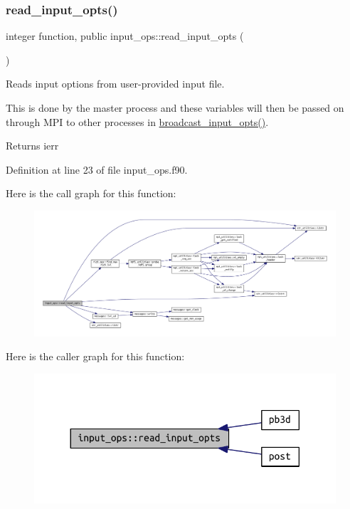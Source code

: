 \subsubsection{\texorpdfstring{read\+\_\+input\+\_\+opts()}{read\_input\_opts()}}
{\footnotesize\ttfamily integer function, public input\+\_\+ops\+::read\+\_\+input\+\_\+opts (\begin{DoxyParamCaption}{ }\end{DoxyParamCaption})}



Reads input options from user-\/provided input file. 

This is done by the master process and these variables will then be passed on through M\+PI to other processes in \hyperlink{namespacempi__ops_a932eba1c998dd7a0f1191b55cd754be3}{broadcast\+\_\+input\+\_\+opts()}.

\begin{DoxyReturn}{Returns}
ierr 
\end{DoxyReturn}


Definition at line 23 of file input\+\_\+ops.\+f90.

Here is the call graph for this function\+:\nopagebreak
\begin{figure}[H]
\begin{center}
\leavevmode
\includegraphics[width=350pt]{namespaceinput__ops_a434acca4f59f9dc1d91e04f846133684_cgraph}
\end{center}
\end{figure}
Here is the caller graph for this function\+:\nopagebreak
\begin{figure}[H]
\begin{center}
\leavevmode
\includegraphics[width=330pt]{namespaceinput__ops_a434acca4f59f9dc1d91e04f846133684_icgraph}
\end{center}
\end{figure}
